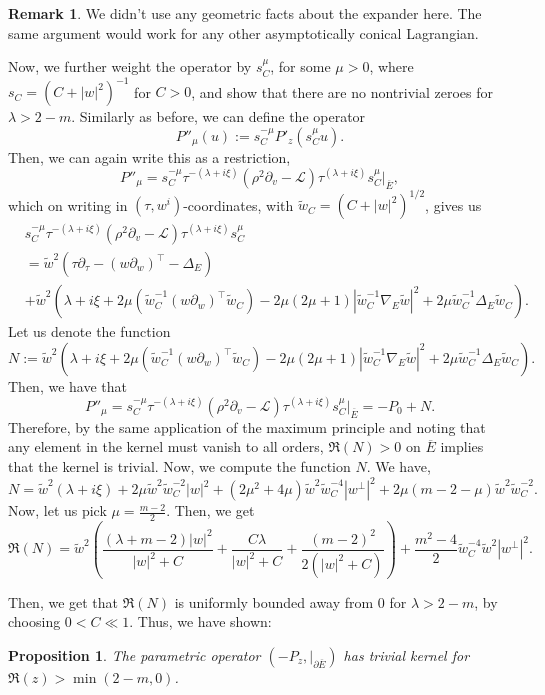 \documentclass[10pt, a4paper]{article}
\theoremstyle{plain}%
\newtheorem{prop}[theorem]{Proposition}
\theoremstyle{definition}
\newtheorem{rem}[theorem]{Remark}
\numberwithin{figure}{section}
\numberwithin{equation}{section}
\newcommand{\pa}{\partial}
\newcommand{\cL}{\mathcal{L}}
\newcommand{\oE}{{\overline{E}}}
\newcommand{\tw}{\tilde{w}}
\begin{document}
\begin{rem}
	We didn't use any geometric facts about the expander here. The same argument would work for any other asymptotically conical Lagrangian.
\end{rem}

Now, we further weight the operator by $s_C^\mu$, for some $\mu >0$, where $s_C = (C+|w|^2)^{-1}$ for $C>0$, and show that there are no nontrivial zeroes for $\lambda >2-m$. Similarly as before, we can define the operator \[
P''_\mu(u) := s_C^{-\mu}P'_z(s_C^\mu u).  
\]
Then, we can again write this as a restriction, \[
P''_\mu = s_C^{-\mu}\tau^{-(\lambda+i\xi)}(\rho^2\pa_v-\cL)\tau^{(\lambda+i\xi)}s_C^\mu|_{\oE},
\]
which on writing in $(\tau,w^i)$-coordinates, with $\tw_C = (C+|w|^2)^{1/2}$, gives us
\begin{equation}
	\begin{split}
&s_C^{-\mu}\tau^{-(\lambda+i\xi)}(\rho^2\pa_v-\cL)\tau^{(\lambda+i\xi)}s_C^\mu \\ &= \tw^2(\tau\pa_\tau -(w\pa_w)^\top-\Delta_E) \\ &+ \tw^2\left(\lambda+i\xi + 2\mu(\tw_C^{-1}(w\pa_w)^\top \tw_C)-2\mu(2\mu+1)|\tw_C^{-1}\nabla_E\tw|^2 +2\mu \tw_C^{-1}\Delta_E\tw_C\right).
\end{split}
\end{equation}
Let us denote the function \[
N:= \tw^2\left(\lambda+i\xi + 2\mu(\tw_C^{-1}(w\pa_w)^\top \tw_C)-2\mu(2\mu+1)|\tw_C^{-1}\nabla_E\tw|^2 +2\mu \tw_C^{-1}\Delta_E\tw_C\right).
\]
Then, we have that 
\[
P''_\mu = s_C^{-\mu}\tau^{-(\lambda+i\xi)}(\rho^2\pa_v-\cL)\tau^{(\lambda+i\xi)}s_C^\mu|_{\oE} = -P_0 + N.
\]
Therefore, by the same application of the maximum principle and noting that any element in the kernel must vanish to all orders, $\Re(N)>0$ on $\oE$ implies that the kernel is trivial. Now, we compute the function $N$. We have,
\[
N = \tw^2(\lambda+i\xi)+2\mu \tw^2\tw_C^{-2}|w|^2 +(2\mu^2+4\mu)\tw^2\tw_C^{-4}|w^\perp|^2+2\mu(m-2-\mu)\tw^2\tw_C^{-2}.
\]
Now, let us pick $\mu = \frac{m-2}{2}$. Then, we get\[
\Re(N) = \tw^2\left(\frac{(\lambda+m-2)|w|^2}{|w|^2+C} + \frac{C\lambda}{|w|^2+C} + \frac{(m-2)^2}{2(|w|^2+C)}\right)+ \frac{m^2-4}{2}\tw_C^{-4}\tw^2|w^\perp|^2.
\]

Then, we get that $\Re(N)$ is uniformly bounded away from $0$ for $\lambda > 2-m$, by choosing $0<C\ll1$. Thus, we have shown:
\begin{prop}\label{prop_nokernel}
The parametric operator $(-P_z,|_{\pa\oE})$ has trivial kernel for $\Re(z) >\min(2-m,0)$.
\end{prop}
\end{document}

